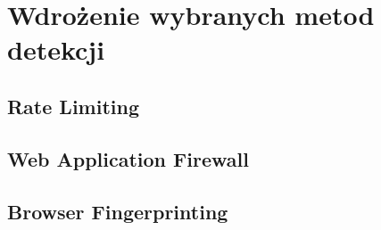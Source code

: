 \newpage

\section{Wdrożenie wybranych metod detekcji}\label{sec:wdrozenie-metod-detekcji}

\subsection{Rate Limiting}

\subsection{Web Application Firewall}

\subsection{Browser Fingerprinting}
